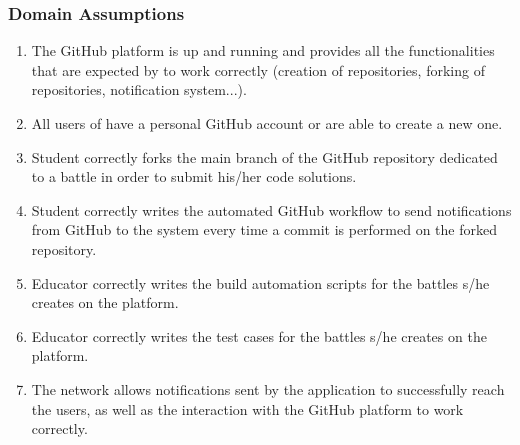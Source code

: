 \subsubsection{Domain Assumptions}
\begin{enumerate}[label=D\arabic*]
		\item The GitHub platform is up and running and provides all the functionalities that are expected by \app to work correctly (creation of repositories, forking of repositories, notification system...).
		\item All users of \app have a personal GitHub account or are able to create a new one.
		\item Student correctly forks the main branch of the GitHub repository dedicated to a battle in order to submit his/her code solutions.
		\item Student correctly writes the automated GitHub workflow to send notifications from GitHub to the system every time a commit is performed on the forked repository.
		\item Educator correctly writes the build automation scripts for the battles s/he creates on the platform.
		\item Educator correctly writes the test cases for the battles s/he creates on the platform.
		\item The network allows notifications sent by the application to successfully reach the users, as well as the interaction with the GitHub platform to work correctly.
	\end{enumerate}